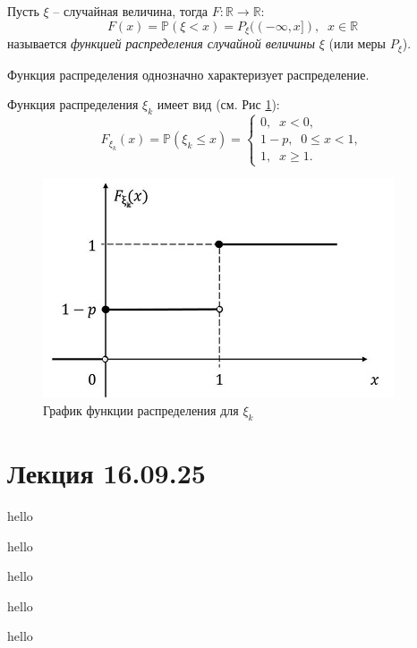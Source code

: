 \documentclass[12pt,a4paper]{article}
\begin{document}
\begin{definition}
    Пусть \(\xi\) -- случайная величина, тогда \(F : \mathbb{R} \to \mathbb{R}\): \[F(x) = \mathbb{P}(\xi < x) = P_{\xi} ((- \infty , x]), \; \; x \in \mathbb{R}\] называется \textit{функцией распределения случайной величины} \(\xi\) (или меры \(P_{\xi}\)).
\end{definition}

\begin{remark}
    Функция распределения однозначно характеризует распределение.
\end{remark}

\begin{example}
    Функция распределения \(\xi_k\) имеет вид (см. Рис \ref{fig:ex2}): \[F_{\xi_{k}} (x) = \mathbb{P}(\xi_{k} \leq x) = \begin{cases}
        0, \; \; x < 0, \\
        1 - p,\;\; 0 \leq x < 1, \\
        1, \;\;x \geq 1.
    \end{cases}\]
\end{example}


\begin{figure}[h]
    \centering
    \includegraphics[scale=0.4]{images/ex2.png}
    \caption{График функции распределения для \(\xi_k\)}
    \label{fig:ex2}
\end{figure}


\section{Лекция 16.09.25}
hello

hello

hello

hello

hello
\end{document}
